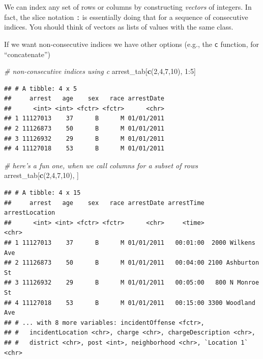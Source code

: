 \documentclass[]{article}
\newenvironment{Shaded}{\begin{snugshade}}{\end{snugshade}}
\newcommand{\KeywordTok}[1]{\textcolor[rgb]{0.13,0.29,0.53}{\textbf{{#1}}}}
\newcommand{\DecValTok}[1]{\textcolor[rgb]{0.00,0.00,0.81}{{#1}}}
\newcommand{\CommentTok}[1]{\textcolor[rgb]{0.56,0.35,0.01}{\textit{{#1}}}}
\newcommand{\NormalTok}[1]{{#1}}
\theoremstyle{definition}
\theoremstyle{definition}
\theoremstyle{remark}
\begin{document}
We can index any set of rows or columns by constructing \emph{vectors}
of integers. In fact, the slice notation \texttt{:} is essentially doing
that for a sequence of consecutive indices. You should think of vectors
as lists of values with the same class.

If we want non-consecutive indices we have other options (e.g., the
\texttt{c} function, for ``concatenate'')

\begin{Shaded}
\begin{Highlighting}[]
\CommentTok{# non-consecutive indices using c}
\NormalTok{arrest_tab[}\KeywordTok{c}\NormalTok{(}\DecValTok{2}\NormalTok{,}\DecValTok{4}\NormalTok{,}\DecValTok{7}\NormalTok{,}\DecValTok{10}\NormalTok{), }\DecValTok{1}\NormalTok{:}\DecValTok{5}\NormalTok{]}
\end{Highlighting}
\end{Shaded}

\begin{verbatim}
## # A tibble: 4 x 5
##     arrest   age    sex   race arrestDate
##      <int> <int> <fctr> <fctr>      <chr>
## 1 11127013    37      B      M 01/01/2011
## 2 11126873    50      B      M 01/01/2011
## 3 11126932    29      B      M 01/01/2011
## 4 11127018    53      B      M 01/01/2011
\end{verbatim}

\begin{Shaded}
\begin{Highlighting}[]
\CommentTok{# here's a fun one, when we call columns for a subset of rows}
\NormalTok{arrest_tab[}\KeywordTok{c}\NormalTok{(}\DecValTok{2}\NormalTok{,}\DecValTok{4}\NormalTok{,}\DecValTok{7}\NormalTok{,}\DecValTok{10}\NormalTok{), ]}
\end{Highlighting}
\end{Shaded}

\begin{verbatim}
## # A tibble: 4 x 15
##     arrest   age    sex   race arrestDate arrestTime    arrestLocation
##      <int> <int> <fctr> <fctr>      <chr>     <time>             <chr>
## 1 11127013    37      B      M 01/01/2011   00:01:00  2000 Wilkens Ave
## 2 11126873    50      B      M 01/01/2011   00:04:00 2100 Ashburton St
## 3 11126932    29      B      M 01/01/2011   00:05:00   800 N Monroe St
## 4 11127018    53      B      M 01/01/2011   00:15:00 3300 Woodland Ave
## # ... with 8 more variables: incidentOffense <fctr>,
## #   incidentLocation <chr>, charge <chr>, chargeDescription <chr>,
## #   district <chr>, post <int>, neighborhood <chr>, `Location 1` <chr>
\end{verbatim}
\end{document}
